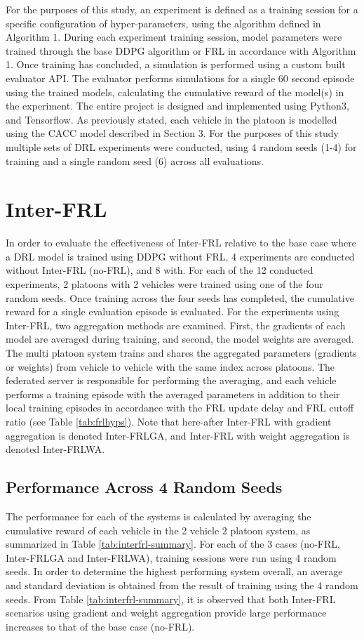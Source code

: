 For the purposes of this study, an experiment is defined as a training session for a
specific configuration of hyper-parameters, using the algorithm defined in Algorithm 1.
During each experiment training session, model parameters were trained through the base
DDPG algorithm or FRL in accordance with Algorithm 1. Once training has concluded, a
simulation is performed using a custom built evaluator API.  The evaluator performs
simulations for a single 60 second episode using the trained models, calculating the
cumulative reward of the model(s) in the experiment.  The entire project is designed and
implemented using Python3, and Tensorflow.  As previously stated, each vehicle in the
platoon is modelled using the CACC model described in Section 3.  For the purposes
of this study multiple sets of DRL experiments were conducted, using 4 random seeds (1-4)
for training and a single random seed (6) across all evaluations.

\section{Inter-FRL}
In order to evaluate the effectiveness of Inter-FRL relative to the base case where a
DRL model is trained using DDPG without FRL, 4 experiments are conducted without
Inter-FRL (no-FRL), and 8 with.  For each of the 12 conducted experiments, 2 platoons
with 2 vehicles were trained using one of the four random seeds.  Once training
across the four seeds has completed, the cumulative reward for a single evaluation
episode is evaluated.  For the experiments using Inter-FRL, two aggregation methods
are examined.  First, the gradients of each model are averaged during training, and
second, the model weights are averaged.  The multi platoon system trains and shares
the aggregated parameters (gradients or weights) from vehicle to vehicle with the same
index across platoons. The federated server is responsible for performing the averaging,
and each vehicle performs a training episode with the averaged parameters in addition
to their local training episodes in accordance with the FRL update delay and FRL
cutoff ratio (see Table \ref{tab:frlhyps}). Note that here-after Inter-FRL with gradient
aggregation is denoted Inter-FRLGA, and Inter-FRL with weight aggregation is denoted
Inter-FRLWA.


\subsection{Performance Across 4 Random Seeds}
The performance for each of the systems is calculated by averaging the cumulative reward
of each vehicle in the 2 vehicle 2 platoon system, as summarized in Table
\ref{tab:interfrl-summary}.  For each of the 3 cases (no-FRL, Inter-FRLGA and Inter-FRLWA),
training sessions were run using 4 random seeds.  In order to determine the highest
performing system overall, an average and standard deviation is obtained from the result
of training using the 4 random seeds. From Table \ref{tab:interfrl-summary}, it is
observed that both Inter-FRL scenarios using gradient and weight aggregation provide
large performance increases to that of the base case (no-FRL).

